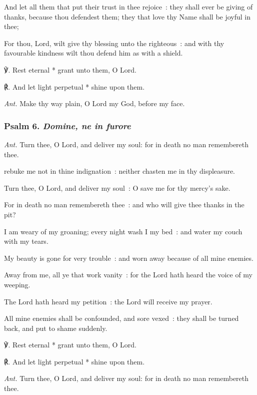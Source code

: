 And let all them that put their trust in thee rejoice~: they shall ever be giving of thanks, because thou defendest them; they that love thy Name shall be joyful in thee;\par
{}For thou, Lord, wilt give thy blessing unto the righteous~: and with thy favourable kindness wilt thou defend him as with a shield.\par
℣. Rest eternal * grant unto them, O Lord.\par
℟. And let light perpetual * shine upon them.\par\noindent
\textit{Ant.} Make thy way plain, O Lord my God, before my face.

\subsubsection{Psalm 6. \textit{Domine, ne in furore}}\par\noindent
\textit{Ant.} Turn thee, {\dag} O Lord, and deliver my soul: for in death no man remembereth thee.\par
{} rebuke me not in thine indignation~: neither chasten me in thy displeasure.\par
{}
Turn thee, O Lord, and deliver my soul~: O save me for thy mercy's sake.\par
{}For in death no man remembereth thee~: and who will give thee thanks in the pit?\par
{}I am weary of my groaning; every night wash I my bed~: and water my couch with my tears.\par
{}My beauty is gone for very trouble~: and worn away because of all mine enemies.\par
{}Away from me, all ye that work vanity~: for the Lord hath heard the voice of my weeping.\par
{}The Lord hath heard my petition~: the Lord will receive my prayer.\par
{}All mine enemies shall be confounded, and sore vexed~: they shall be turned back, and put to shame suddenly.\par
℣. Rest eternal * grant unto them, O Lord.\par
℟. And let light perpetual * shine upon them.\par\noindent
\textit{Ant.} Turn thee, O Lord, and deliver my soul: for in death no man remembereth thee.

